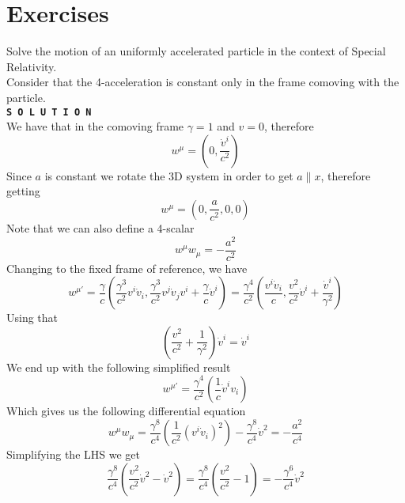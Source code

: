 \documentclass[../electromagnetism.tex]{subfiles}
\begin{document}
\section{Exercises}
\begin{exe}
	Solve the motion of an uniformly accelerated particle in the context of Special Relativity.\\
	Consider that the 4-acceleration is constant only in the frame comoving with the particle.\\
	\textbf{\texttt{S O L U T I O N}}\\
	We have that in the comoving frame $\gamma=1$ and $v=0$, therefore
	\begin{equation*}
		w^\mu=\left( 0,\frac{\dot{v}^i}{c^2} \right)
	\end{equation*}
	Since $a$ is constant we rotate the 3D system in order to get $a\parallel x$, therefore getting
	\begin{equation*}
		w^\mu=\left( 0,\frac{a}{c^2},0,0 \right)
	\end{equation*}
	Note that we can also define a 4-scalar
	\begin{equation*}
		w^\mu w_\mu=-\frac{a^2}{c^2}
	\end{equation*}
	Changing to the fixed frame of reference, we have
	\begin{equation*}
		w^{\mu'}=\frac{\gamma}{c}\left( \frac{\gamma^3}{c^2}v^{i}\dot{v}_i,\frac{\gamma^3}{c^2}v^{j}\dot{v}_jv^{i}+\frac{\gamma}{c}\dot{v}^{i} \right)=\frac{\gamma^4}{c^2}\left( \frac{v^{i}\dot{v}_i}{c},\frac{v^{2}}{c^2}\dot{v}^{i}+\frac{\dot{v}^{i}}{\gamma^2} \right)
	\end{equation*}
	Using that
	\begin{equation*}
		\left( \frac{v^2}{c^2}+\frac{1}{\gamma^2} \right)\dot{v}^i=\dot{v}^i
	\end{equation*}
	We end up with the following simplified result
	\begin{equation*}
		w^{\mu'}=\frac{\gamma^4}{c^2}\left( \frac{1}{c}\dot{v}^{i}v_i \right)
	\end{equation*}
	Which gives us the following differential equation
	\begin{equation*}
		w^\mu w_\mu=\frac{\gamma^8}{c^4}\left( \frac{1}{c^2}(v^i\dot{v}_i)^2 \right)-\frac{\gamma^8}{c^4}\dot{v}^2=-\frac{a^2}{c^4}
	\end{equation*}
	Simplifying the LHS we get
	\begin{equation*}
		\frac{\gamma^8}{c^4}\left( \frac{v^2}{c^2}\dot{v}^2-\dot{v}^2 \right)=\frac{\gamma^8}{c^4}\left( \frac{v^2}{c^2}-1 \right)=-\frac{\gamma^6}{c^4}\dot{v}^2

\end{equation*}
\end{exe}
\end{document}
